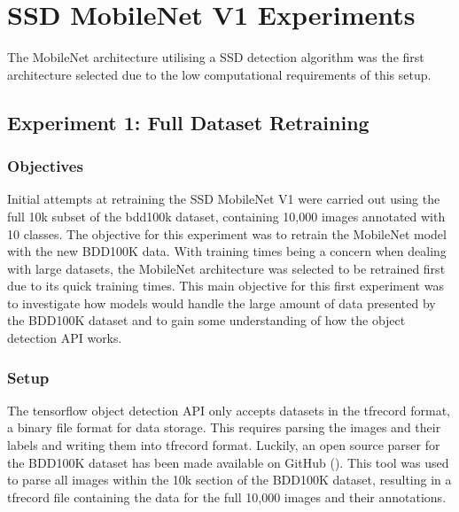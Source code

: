 \documentclass[12pt]{report}
\begin{document}
\section{SSD MobileNet V1 Experiments}
\begin{flushleft}
The MobileNet architecture utilising a SSD detection algorithm was the first architecture selected due to the low computational requirements of this setup.
\end{flushleft}

\subsection{Experiment 1: Full Dataset Retraining}
\subsubsection*{Objectives}
\begin{flushleft}
Initial attempts at retraining the SSD MobileNet V1 were carried out using the full 10k subset of the bdd100k dataset, containing 10,000 images annotated with 10 classes. The objective for this experiment was to retrain the MobileNet model with the new BDD100K data. With training times being a concern when dealing with large datasets, the MobileNet architecture was selected to be retrained first due to its quick training times. This main objective for this first experiment was to investigate how models would handle the large amount of data presented by the BDD100K dataset and to gain some understanding of how the object detection API works. 
\end{flushleft}

\subsubsection*{Setup}
\begin{flushleft}
The tensorflow object detection API only accepts datasets in the tfrecord format, a binary file format for data storage. This requires parsing the images and their labels and writing them into tfrecord format. Luckily, an open source parser for the BDD100K dataset has been made available on GitHub (\cite{parser}). This tool was used to parse all images within the 10k section of the BDD100K dataset, resulting in a tfrecord file containing the data for the full 10,000 images and their annotations.
\end{flushleft}
\end{document}
